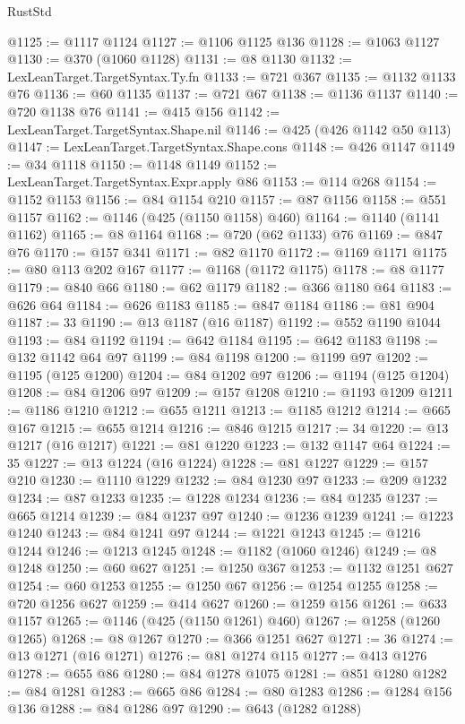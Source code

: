 \begin{lexlean}{RustStd}
\begin{coremodule}
{\begin{coremodule}
{{{{{{{{{{{{{{{{{{{{{{{{{{{{{{{{{{{{{{{{{{{{{{{{{{{{{{@1125 := @1117 @1124
@1127 := @1106 @1125 @136
@1128 := @1063 @1127
@1130 := @370 (@1060 @1128)
@1131 := @8 @1130
@1132 := LexLeanTarget.TargetSyntax.Ty.fn
@1133 := @721 @367
@1135 := @1132 @1133 @76
@1136 := @60 @1135
@1137 := @721 @67
@1138 := @1136 @1137
@1140 := @720 @1138 @76
@1141 := @415 @156
@1142 := LexLeanTarget.TargetSyntax.Shape.nil
@1146 := @425 (@426 @1142 @50 @113)
@1147 := LexLeanTarget.TargetSyntax.Shape.cons
@1148 := @426 @1147
@1149 := @34 @1118
@1150 := @1148 @1149
@1152 := LexLeanTarget.TargetSyntax.Expr.apply @86
@1153 := @114 @268
@1154 := @1152 @1153
@1156 := @84 @1154 @210
@1157 := @87 @1156
@1158 := @551 @1157
@1162 := @1146 (@425 (@1150 @1158) @460)
@1164 := @1140 (@1141 @1162)
@1165 := @8 @1164
@1168 := @720 (@62 @1133) @76
@1169 := @847 @76
@1170 := @157 @341
@1171 := @82 @1170
@1172 := @1169 @1171
@1175 := @80 @113 @202 @167
@1177 := @1168 (@1172 @1175)
@1178 := @8 @1177
@1179 := @840 @66
@1180 := @62 @1179
@1182 := @366 @1180 @64
@1183 := @626 @64
@1184 := @626 @1183
@1185 := @847 @1184
@1186 := @81 @904
@1187 := 33
@1190 := @13 @1187 (@16 @1187)
@1192 := @552 @1190 @1044
@1193 := @84 @1192
@1194 := @642 @1184
@1195 := @642 @1183
@1198 := @132 @1142 @64 @97
@1199 := @84 @1198
@1200 := @1199 @97
@1202 := @1195 (@125 @1200)
@1204 := @84 @1202 @97
@1206 := @1194 (@125 @1204)
@1208 := @84 @1206 @97
@1209 := @157 @1208
@1210 := @1193 @1209
@1211 := @1186 @1210
@1212 := @655 @1211
@1213 := @1185 @1212
@1214 := @665 @167
@1215 := @655 @1214
@1216 := @846 @1215
@1217 := 34
@1220 := @13 @1217 (@16 @1217)
@1221 := @81 @1220
@1223 := @132 @1147 @64
@1224 := 35
@1227 := @13 @1224 (@16 @1224)
@1228 := @81 @1227
@1229 := @157 @210
@1230 := @1110 @1229
@1232 := @84 @1230 @97
@1233 := @209 @1232
@1234 := @87 @1233
@1235 := @1228 @1234
@1236 := @84 @1235
@1237 := @665 @1214
@1239 := @84 @1237 @97
@1240 := @1236 @1239
@1241 := @1223 @1240
@1243 := @84 @1241 @97
@1244 := @1221 @1243
@1245 := @1216 @1244
@1246 := @1213 @1245
@1248 := @1182 (@1060 @1246)
@1249 := @8 @1248
@1250 := @60 @627
@1251 := @1250 @367
@1253 := @1132 @1251 @627
@1254 := @60 @1253
@1255 := @1250 @67
@1256 := @1254 @1255
@1258 := @720 @1256 @627
@1259 := @414 @627
@1260 := @1259 @156
@1261 := @633 @1157
@1265 := @1146 (@425 (@1150 @1261) @460)
@1267 := @1258 (@1260 @1265)
@1268 := @8 @1267
@1270 := @366 @1251 @627
@1271 := 36
@1274 := @13 @1271 (@16 @1271)
@1276 := @81 @1274 @115
@1277 := @413 @1276
@1278 := @655 @86
@1280 := @84 @1278 @1075
@1281 := @851 @1280
@1282 := @84 @1281
@1283 := @665 @86
@1284 := @80 @1283
@1286 := @1284 @156 @136
@1288 := @84 @1286 @97
@1290 := @643 (@1282 @1288)
}}}}}}}}}}}}}}}}}}}}}}}}}}}}}}}}}}}}}}}}}}}}}}}}}}}}}}
\end{coremodule}}
\end{coremodule}
\end{lexlean}
